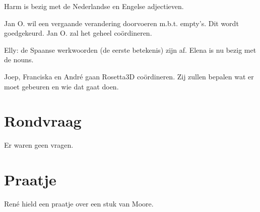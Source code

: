 Harm is bezig met de Nederlandse en Engelse adjectieven.

Jan O. wil een vergaande verandering doorvoeren m.b.t. empty's. Dit wordt 
goedgekeurd. Jan O. zal het geheel co\"{o}rdineren.

Elly: de Spaanse werkwoorden (de eerste betekenis) zijn af. Elena is nu bezig
met de nouns. 

Joep, Franciska en Andr\'{e} gaan Rosetta3D co\"{o}rdineren. Zij zullen bepalen 
wat er moet gebeuren en wie dat gaat doen.


\section{Rondvraag}

Er waren geen vragen.

\section{Praatje}

Ren\'{e} hield een praatje over een stuk van Moore.



